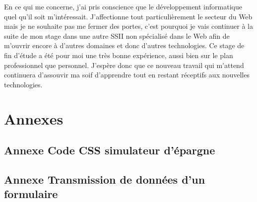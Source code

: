 \documentclass[a4paper,11pt,twoside]{report}
\begin{document}
  En ce qui me concerne, j'ai pris conscience que le développement informatique quel qu'il soit m'intéressait. J'affectionne tout particulièrement le secteur du Web mais je ne souhaite pas me fermer des portes, c'est pourquoi je vais continuer à la suite de mon stage dans une autre SSII non spécialisé dans le Web afin de m'ouvrir encore à d'autres domaines et donc d'autres technologies. Ce stage de fin d'étude a été pour moi une très bonne expérience, aussi bien sur le plan professionnel que personnel. J'espère donc que ce nouveau travail qui m'attend continuera d'assouvir ma soif d'apprendre tout en restant réceptifs aux nouvelles technologies.
\chapter*{Annexes}
\thispagestyle{\chead{}}
  
  \section*{Annexe Code CSS simulateur d'épargne}
  \label{code_CSS_simulateur_d_epargne}
  
  
    \newpage
  
  \section*{Annexe Transmission de données d'un formulaire}
  \label{transmission_de_donnees_d_un_formulaire}
  
  
    \newpage
  
\end{document}
